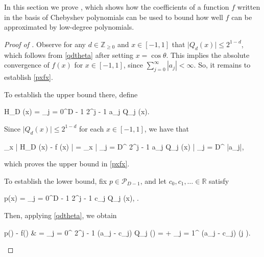 	\label{ProofSumaj}
	
	In this section we prove , which shows how the coefficients of a function $f$ written in the basis of Chebyshev polynomials can be used to bound how well $f$ can be approximated by low-degree polynomials.

	
	\begin{proof}[Proof of ] 
	
	    Observe for any $d \in \mathbb{Z}_{\ge 0}$ and $x \in [-1, 1]$ that $\big| Q_d (x) \big| \le 2^{1 - d}$, which follows from \eqref{qdtheta} after setting $x = \cos \theta$. This implies the absolute convergence of $f(x)$ for $x \in [-1, 1]$, since $\sum_{j = 0}^{\infty} |a_j| < \infty$. So, it remains to establish \eqref{pxfx}. 
		
		To establish the upper bound there, define
		\begin{flalign}
		\label{hdx}
		H_D (x) = \displaystyle\sum_{j = 0}^{D - 1} 2^{j - 1} a_j Q_j (x).
		\end{flalign}
		
		\noindent Since $\big| Q_d (x) \big| \le 2^{1 - d}$ for each $x \in [-1, 1]$, we have that 
		\begin{flalign}
		\label{hdxfxestimate} 
		\displaystyle\sup_{x \in [-1, 1]} \big| H_D (x) - f (x) \big|  = \displaystyle\sup_{x \in [-1, 1]} \Bigg| \displaystyle\sum_{j = D}^{\infty} 2^{j - 1} a_j Q_j (x)  \Bigg| \le \displaystyle\sum_{j = D}^{\infty} |a_j|,
		\end{flalign}
		
		\noindent which proves the upper bound in \eqref{pxfx}.
		
		To establish the lower bound, fix $p \in \mathcal{P}_{D - 1}$, and let $c_0, c_1, \ldots \in \mathbb{R}$ satisfy 
		\begin{flalign*}
		p(x) = \displaystyle\sum_{j = 0}^{D - 1} 2^{j - 1} c_j Q_j (x), \quad \text{and $c_j = 0$ for $j \ge D$}. 
		\end{flalign*}
		
		\noindent Then, applying \eqref{qdtheta}, we obtain 
		\begin{flalign}
		\label{pxfx1} 
		\begin{aligned}
		p(\cos \theta) - f(\cos \theta) & = \displaystyle\sum_{j = 0}^{\infty} 2^{j - 1} (a_j - c_j) Q_j (\cos \theta)  = \displaystyle{} + \displaystyle\sum_{j = 1}^{\infty} (a_j - c_j) \cos (j \theta).
		\end{aligned}
		\end{flalign} 
		

\end{proof}
